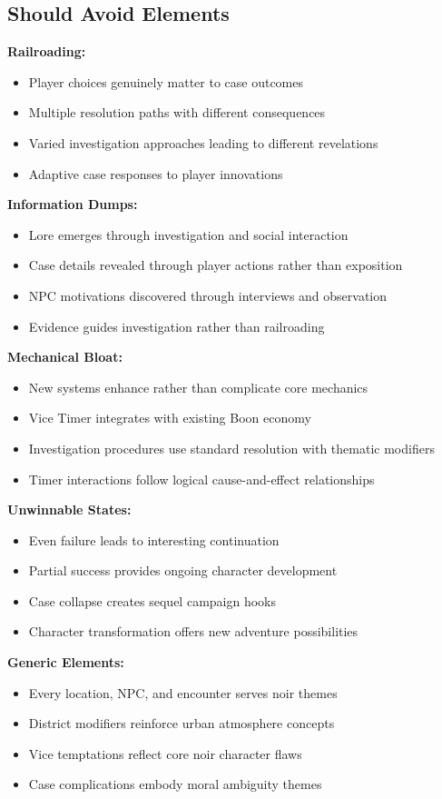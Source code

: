 \documentclass[11pt]{article}
\begin{document}
\subsection{Should Avoid Elements}

\textbf{Railroading:}
\begin{itemize}
\item Player choices genuinely matter to case outcomes
\item Multiple resolution paths with different consequences
\item Varied investigation approaches leading to different revelations
\item Adaptive case responses to player innovations
\end{itemize}

\textbf{Information Dumps:}
\begin{itemize}
\item Lore emerges through investigation and social interaction
\item Case details revealed through player actions rather than exposition
\item NPC motivations discovered through interviews and observation
\item Evidence guides investigation rather than railroading
\end{itemize}

\textbf{Mechanical Bloat:}
\begin{itemize}
\item New systems enhance rather than complicate core mechanics
\item Vice Timer integrates with existing Boon economy
\item Investigation procedures use standard resolution with thematic modifiers
\item Timer interactions follow logical cause-and-effect relationships
\end{itemize}

\textbf{Unwinnable States:}
\begin{itemize}
\item Even failure leads to interesting continuation
\item Partial success provides ongoing character development
\item Case collapse creates sequel campaign hooks
\item Character transformation offers new adventure possibilities
\end{itemize}

\textbf{Generic Elements:}
\begin{itemize}
\item Every location, NPC, and encounter serves noir themes
\item District modifiers reinforce urban atmosphere concepts
\item Vice temptations reflect core noir character flaws
\item Case complications embody moral ambiguity themes
\end{itemize}
\end{document}
